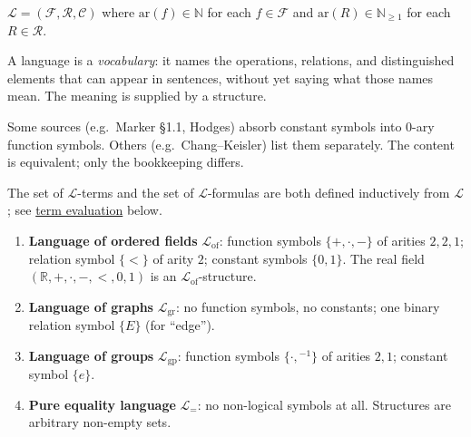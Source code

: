 \begin{remark*}
$\mathcal{L} = (\mathcal{F}, \mathcal{R}, \mathcal{C})$ where
$\mathrm{ar}(f) \in \mathbb{N}$ for each $f \in \mathcal{F}$ and
$\mathrm{ar}(R) \in \mathbb{N}_{\geq 1}$ for each $R \in \mathcal{R}$.
\end{remark*}

\begin{remark*}[Intuition]
A language is a \emph{vocabulary}: it names the operations, relations, and
distinguished elements that can appear in sentences, without yet saying what
those names mean. The meaning is supplied by a structure.
\end{remark*}

\begin{remark*}
Some sources (e.g.\ Marker \S1.1, Hodges) absorb constant symbols into
0-ary function symbols. Others (e.g.\ Chang--Keisler) list them separately.
The content is equivalent; only the bookkeeping differs.
\end{remark*}

\begin{remark*}[Consequence]
The set of $\mathcal{L}$-terms and the set of $\mathcal{L}$-formulas are
both defined inductively from $\mathcal{L}$; see
\hyperref[def:term-evaluation]{term evaluation} below.
\end{remark*}


\begin{example*}
\begin{enumerate}
  \item \textbf{Language of ordered fields} $\mathcal{L}_{\mathrm{of}}$:
        function symbols $\{+, \cdot, -\}$ of arities $2, 2, 1$;
        relation symbol $\{<\}$ of arity $2$;
        constant symbols $\{0, 1\}$.
        The real field $(\mathbb{R}, +, \cdot, -, <, 0, 1)$ is an
        $\mathcal{L}_{\mathrm{of}}$-structure.

  \item \textbf{Language of graphs} $\mathcal{L}_{\mathrm{gr}}$:
        no function symbols, no constants;
        one binary relation symbol $\{E\}$ (for ``edge'').

  \item \textbf{Language of groups} $\mathcal{L}_{\mathrm{gp}}$:
        function symbols $\{\cdot, {}^{-1}\}$ of arities $2, 1$;
        constant symbol $\{e\}$.

  \item \textbf{Pure equality language} $\mathcal{L}_{=}$:
        no non-logical symbols at all. Structures are arbitrary
        non-empty sets.
\end{enumerate}
\end{example*}


